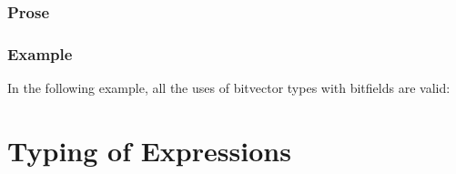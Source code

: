 \documentclass{book}
\begin{document}
\begin{itemize}
\subsection{Prose}


\subsection{Example}
In the following example, all the uses of bitvector types with bitfields are valid:







\chapter{Typing of Expressions}


\end{itemize}
\end{document}
